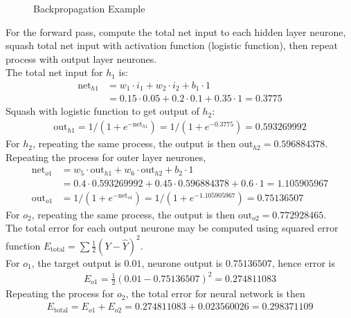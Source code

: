 \begin{example} 
\begin{figure}[H]
\centering
\scalebox{0.75}{}
\caption{Backpropagation Example}
\end{figure}
For the forward pass, compute the total net input to each hidden layer neurone, squash total net input with activation function (logistic function), then repeat process with output layer neurones.\\
The total net input for $h_1$ is:
\begin{align}
\text{net}_{h1} &= w_1 \cdot i_1 + w_2 \cdot i_2 + b_1 \cdot 1 \nonumber \\
&= 0.15 \cdot 0.05 + 0.2 \cdot 0.1 + 0.35 \cdot 1 = 0.3775 \nonumber
\end{align}
Squash with logistic function to get output of $h_2$:
\begin{align}
\text{out}_{h1} = 1/(1 + e^{-\text{net}_{h1}}) = 1/(1 + e^{-0.3775}) = 0.593269992 \nonumber
\end{align}
For $h_2$, repeating the same process, the output is then $\text{out}_{h2} = 0.596884378$.\\
Repeating the process for outer layer neurones,
\begin{align}
\text{net}_{o1} &= w_5 \cdot \text{out}_{h1} + w_6 \cdot \text{out}_{h2} + b_2 \cdot 1 \nonumber \\
&= 0.4 \cdot 0.593269992 + 0.45 \cdot 0.596884378 + 0.6 \cdot 1 = 1.105905967 \nonumber \\
\text{out}_{o1} &= 1/(1 + e^{-\text{net}_{o1}}) = 1/(1 + e^{-1.105905967}) = 0.75136507 \nonumber
\end{align}
For $o_2$, repeating the same process, the output is then $\text{out}_{o2} = 0.772928465$.\\
The total error for each output neurone may be computed using squared error function $E_{\text{total}} = \sum \frac{1}{2} (Y - \hat{Y})^2$.\\
For $o_1$, the target output is $0.01$, neurone output is $0.75136507$, hence error is
\begin{align}
E_{o1} = \frac{1}{2} (0.01 - 0.75136507)^2 = 0.274811083 \nonumber
\end{align}
Repeating the process for $o_2$, the total error for neural network is then
\begin{align}
E_{\text{total}} = E_{o1} + E_{o2} = 0.274811083 + 0.023560026 = 0.298371109 \nonumber
\end{align}

\end{example}
